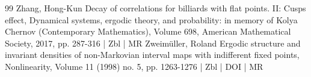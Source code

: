 \begin{thebibliography}{99}
Zhang, Hong-Kun Decay of correlations for billiards with flat points. II: Cusps effect, Dynamical systems, ergodic theory, and probability: in memory of Kolya Chernov (Contemporary Mathematics), Volume 698, American Mathematical Society, 2017, pp. 287-316 | Zbl | MR
Zweimüller, Roland Ergodic structure and invariant densities of non-Markovian interval maps with indifferent fixed points, Nonlinearity, Volume 11 (1998) no. 5, pp. 1263-1276 | Zbl | DOI | MR
\end{thebibliography}
